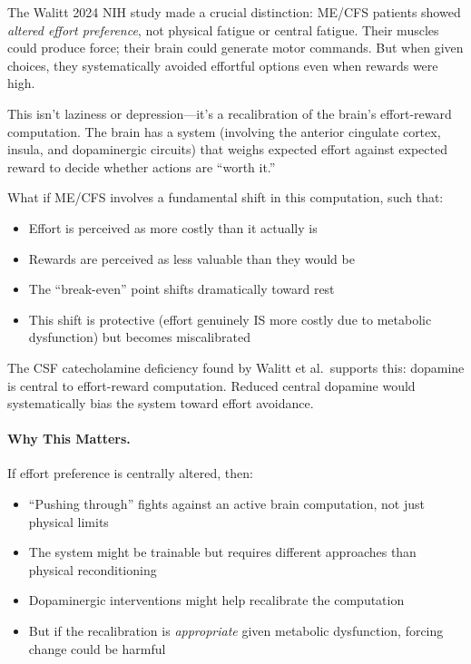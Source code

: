 \begin{open_question}
The Walitt 2024 NIH study made a crucial distinction: ME/CFS patients showed \textit{altered effort preference}, not physical fatigue or central fatigue. Their muscles could produce force; their brain could generate motor commands. But when given choices, they systematically avoided effortful options even when rewards were high.

This isn't laziness or depression---it's a recalibration of the brain's effort-reward computation. The brain has a system (involving the anterior cingulate cortex, insula, and dopaminergic circuits) that weighs expected effort against expected reward to decide whether actions are ``worth it.''

What if ME/CFS involves a fundamental shift in this computation, such that:
\begin{itemize}
    \item Effort is perceived as more costly than it actually is
    \item Rewards are perceived as less valuable than they would be
    \item The ``break-even'' point shifts dramatically toward rest
    \item This shift is protective (effort genuinely IS more costly due to metabolic dysfunction) but becomes miscalibrated
\end{itemize}

The CSF catecholamine deficiency found by Walitt et al.\ supports this: dopamine is central to effort-reward computation. Reduced central dopamine would systematically bias the system toward effort avoidance.
\end{open_question}

\paragraph{Why This Matters.} If effort preference is centrally altered, then:
\begin{itemize}
    \item ``Pushing through'' fights against an active brain computation, not just physical limits
    \item The system might be trainable but requires different approaches than physical reconditioning
    \item Dopaminergic interventions might help recalibrate the computation
    \item But if the recalibration is \textit{appropriate} given metabolic dysfunction, forcing change could be harmful
\end{itemize}

